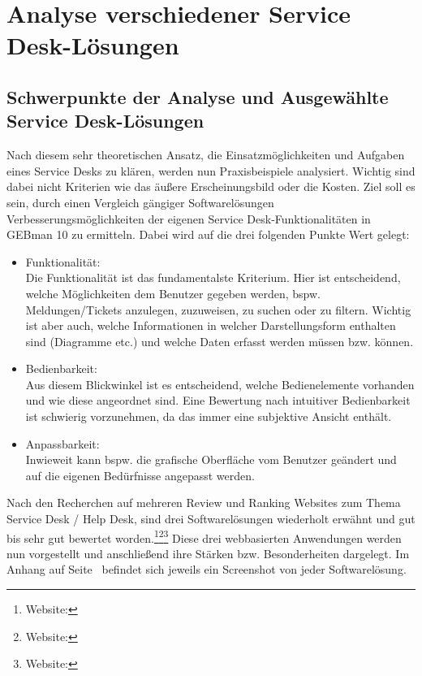 \section{Analyse verschiedener Service Desk-Lösungen}

\subsection{Schwerpunkte der Analyse und Ausgewählte Service Desk-Lösungen}

\noindent
Nach diesem sehr theoretischen Ansatz, die Einsatzmöglichkeiten und Aufgaben eines Service Desks zu klären, werden nun Praxisbeispiele analysiert. Wichtig sind dabei nicht Kriterien wie das äußere Erscheinungsbild oder die Kosten. Ziel soll es sein, durch einen Vergleich gängiger Softwarelösungen Verbesserungsmöglichkeiten der eigenen Service Desk-Funktionalitäten in GEBman 10 zu ermitteln. Dabei wird auf die drei folgenden Punkte Wert gelegt:

\begin{itemize}
\item Funktionalität:\\
		Die Funktionalität ist das fundamentalste Kriterium. Hier ist entscheidend, welche 			
		Möglichkeiten dem Benutzer gegeben werden, bspw. Meldungen/Tickets anzulegen, zuzuweisen, 
		zu suchen oder zu filtern. Wichtig ist aber auch, welche Informationen in welcher 
		Darstellungsform enthalten sind (Diagramme etc.) und welche Daten erfasst werden müssen 
		bzw. können.\\
		 
\item Bedienbarkeit:\\
		Aus diesem Blickwinkel ist es entscheidend, welche Bedienelemente vorhanden und wie diese angeordnet sind. Eine	
		Bewertung nach intuitiver Bedienbarkeit ist schwierig vorzunehmen, da das immer eine
		subjektive Ansicht enthält.\\
		
\item Anpassbarkeit:\\
		Inwieweit kann bspw. die grafische Oberfläche vom Benutzer geändert und auf die 
		eigenen Bedürfnisse angepasst werden.\\		
\end{itemize}


\noindent
Nach den Recherchen auf mehreren Review und Ranking Websites zum Thema Service Desk / Help Desk, sind drei Softwarelösungen wiederholt erwähnt und gut bis sehr gut bewertet worden.\footnote{Website:\cite{Ranking1}}\footnote{Website:\cite{Ranking2}}\footnote{Website:\cite{Ranking3}} Diese drei webbasierten Anwendungen werden nun vorgestellt und anschließend ihre Stärken bzw. Besonderheiten dargelegt. Im Anhang auf Seite~\pageref{Anhang3} befindet sich jeweils ein Screenshot von jeder Softwarelösung.

